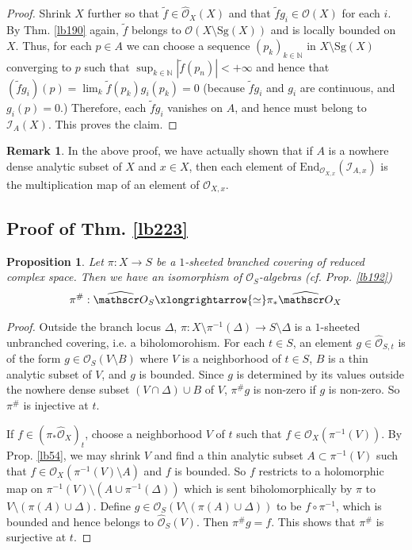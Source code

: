 \documentclass[12pt,b5paper,notitlepage]{report}
\theoremstyle{definition}
\newtheorem{rem}[df]{Remark}
\theoremstyle{plain}
\newtheorem{pp}[df]{Proposition}
\newcommand{\wtd}{\widetilde}
\newcommand{\wht}{\widehat}
\newcommand{\End}{\mathrm{End}} %
\newcommand{\scr}{\mathscr}
\newcommand{\Nbb}{\mathbb N}
\newcommand{\Sg}{\mathrm{Sg}}
\newcommand{\Owht}{\widehat{\scr O}}
\numberwithin{equation}{section}
\begin{document}
\begin{proof}
Shrink $X$ further so that $\wtd f\in\Owht_X(X)$ and that $\wtd fg_i\in\scr O(X)$ for each $i$. By Thm. \ref{lb190} again, $\wtd f$ belongs to $\scr O(X\setminus \Sg(X))$ and is locally bounded on $X$. Thus, for each $p\in A$ we can choose a sequence $(p_k)_{k\in\Nbb}$ in $X\setminus\Sg(X)$ converging to $p$ such that $\sup_{k\in\Nbb}|\wtd f(p_n)|<+\infty$ and hence that $(\wtd f g_i)(p)=\lim_k\wtd f(p_k)g_i(p_k)=0$ (because $\wtd fg_i$ and $g_i$ are continuous, and $g_i(p)=0$.) Therefore, each $\wtd fg_i$ vanishes on $A$, and hence must belong to $\scr I_{A}(X)$. This proves the claim. 
\end{proof}


\begin{rem}
In the above proof, we have actually shown that if $A$ is a nowhere dense analytic subset of $X$ and $x\in X$, then each element of $\End_{\scr O_{X,x}}(\scr I_{A,x})$ is the multiplication map of an element of $\wht{\scr O}_{X,x}$.
\end{rem}




\subsection{Proof of Thm. \ref{lb223}}


\begin{pp}\label{lb225}
Let $\pi:X\rightarrow S$ be a $1$-sheeted branched covering of reduced complex space. Then we have an isomorphism of $\scr O_S$-algebras (cf. Prop. \ref{lb192})
\begin{align*}
\pi^\#:\Owht_S\xlongrightarrow{\simeq}\pi_*\Owht_X
\end{align*}
\end{pp}

\begin{proof}
Outside the branch locus $\Delta$, $\pi:X\setminus\pi^{-1}(\Delta)\rightarrow S\setminus\Delta$ is a $1$-sheeted unbranched covering, i.e. a biholomorohism. For each $t\in S$, an element $g\in\Owht_{S,t}$ is of the form $g\in\scr O_S(V\setminus B)$ where $V$ is a neighborhood of $t\in S$, $B$ is a thin analytic subset of $V$, and $g$ is bounded. Since $g$ is determined by its values outside the nowhere dense subset $(V\cap\Delta)\cup B$ of $V$, $\pi^\#g$ is non-zero if $g$ is non-zero. So $\pi^\#$ is injective at $t$.

If $f\in(\pi_*\Owht_X)_t$,  choose a neighborhood $V$ of $t$ such that $f\in\Owht_X(\pi^{-1}(V))$. By Prop. \ref{lb54}, we may shrink $V$ and find a thin analytic subset $A\subset\pi^{-1}(V)$ such that $f\in\scr O_X(\pi^{-1}(V)\setminus A)$ and $f$ is bounded. So $f$ restricts to a holomorphic map on $\pi^{-1}(V)\setminus(A\cup\pi^{-1}(\Delta))$ which is sent biholomorphically by $\pi$ to $V\setminus (\pi(A)\cup \Delta)$. Define $g\in\scr O_S(V\setminus(\pi(A)\cup\Delta))$ to be $f\circ\pi^{-1}$, which is bounded and hence belongs to $\Owht_S(V)$. Then $\pi^\#g=f$. This shows that $\pi^\#$ is surjective at $t$.
\end{proof}
\end{document}
